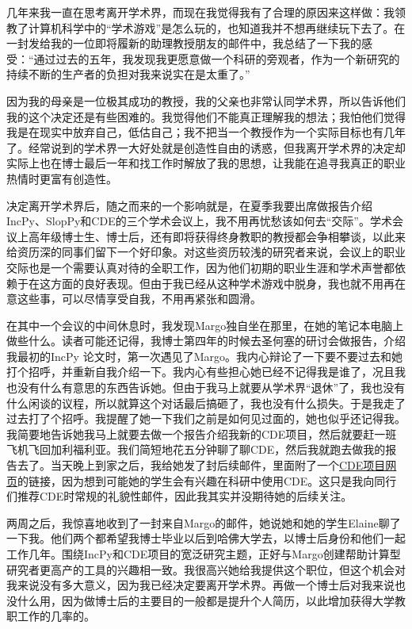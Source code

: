 \documentclass[12pt,UTF8,nofonts]{book}
\begin{document}
几年来我一直在思考离开学术界，而现在我觉得我有了合理的原因来这样做：我领教了计算机科学中的“学术游戏”是怎么玩的，也知道我并不想再继续玩下去了。在一封发给我的一位即将履新的助理教授朋友的邮件中，我总结了一下我的感受：“通过过去的五年，我发现我更愿意做一个科研的旁观者，作为一个新研究的持续不断的生产者的负担对我来说实在是太重了。”

因为我的母亲是一位极其成功的教授，我的父亲也非常认同学术界，所以告诉他们我的这个决定还是有些困难的。我觉得他们不能真正理解我的想法；我怕他们觉得我是在现实中放弃自己，低估自己；我不把当一个教授作为一个实际目标也有几年了。经常说到的学术界一大好处就是创造性自由的诱惑，但我离开学术界的决定却实际上也在博士最后一年和找工作时解放了我的思想，让我能在追寻我真正的职业热情时更富有创造性。

\breakline

决定离开学术界后，随之而来的一个影响就是，在夏季我要出席做报告介绍IncPy、SlopPy和CDE的三个学术会议上，我不用再忧愁该如何去“交际”。学术会议上高年级博士生、博士后，还有即将获得终身教职的教授都会争相攀谈，以此来给资历深的同事们留下一个好印象。对这些资历较浅的研究者来说，会议上的职业交际也是一个需要认真对待的全职工作，因为他们初期的职业生涯和学术声誉都依赖于在这方面的良好表现。但由于我已经从这种学术游戏中脱身，我也就不用再在意这些事，可以尽情享受自我，不用再紧张和圆滑。

在其中一个会议的中间休息时，我发现Margo独自坐在那里，在她的笔记本电脑上做些什么。读者可能还记得，我博士第四年的时候去圣何塞的研讨会做报告，介绍我最初的IncPy 论文时，第一次遇见了Margo。我内心辩论了一下要不要过去和她打个招呼，并重新自我介绍一下。我内心有些担心她已经不记得我是谁了，况且我也没有什么有意思的东西告诉她。但由于我马上就要从学术界“退休”了，我也没有什么闲谈的议程，所以就算这个对话最后搞砸了，我也没有什么损失。于是我走了过去打了个招呼。我提醒了她一下我们之前是如何见过面的，她也似乎还记得我。我简要地告诉她我马上就要去做一个报告介绍我新的CDE项目，然后就要赶一班飞机飞回加利福利亚。我们简短地花五分钟聊了聊CDE，然后我就跑去做我的报告去了。当天晚上到家之后，我给她发了封后续邮件，里面附了一个\href{http://www.pgbovine.net/cde.html}{CDE项目网页}的链接，因为想到可能她的学生会有兴趣在科研中使用CDE。这只是我向同行们推荐CDE时常规的礼貌性邮件，因此我其实并没期待她的后续关注。

两周之后，我惊喜地收到了一封来自Margo的邮件，她说她和她的学生Elaine聊了一下我。他们两个都希望我博士毕业以后到哈佛大学去，以博士后身份和他们一起工作几年。围绕IncPy和CDE项目的宽泛研究主题，正好与Margo创建帮助计算型研究者更高产的工具的兴趣相一致。我很高兴她给我提供这个职位，但这个机会对我来说没有多大意义，因为我已经决定要离开学术界。再做一个博士后对我来说也没什么用，因为做博士后的主要目的一般都是提升个人简历，以此增加获得大学教职工作的几率的。
\end{document}
